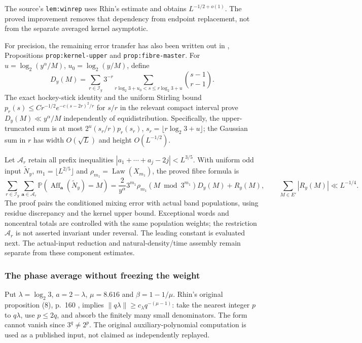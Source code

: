 The source's \texttt{lem:winrep} uses Rhin's estimate and obtains
$L^{-1/2+o(1)}$. The proved improvement removes that dependency from
endpoint replacement, not from the separate averaged kernel asymptotic.

For precision, the remaining error transfer has also been written out in
,
Propositions \texttt{prop:kernel-upper} and \texttt{prop:fibre-master}.
For $u=\log_2(y^\alpha/M)$, $u_0=\log_2(y/M)$, define
\[
 D_y(M)=\sum_{r\in\mathcal I_y}3^{-r}
       \sum_{r\log_2 3+u_0<s\le r\log_2 3+u}\binom{s-1}{r-1}.
\]
The exact hockey-stick identity and the uniform Stirling bound
$p_r(s)\le Cr^{-1/2}e^{-c(s-2r)^2/r}$ for $s/r$ in the relevant compact
interval prove $D_y(M)\ll y^\alpha/M$ independently of equidistribution.
Specifically, the upper-truncated sum is at most
$2^u(s_r/r)p_r(s_r)$, $s_r=\lfloor r\log_2 3+u\rfloor$;
the Gaussian sum in $r$ has width $O(\sqrt L)$ and height $O(L^{-1/2})$.

Let $\mathcal A_r$ retain all prefix inequalities
$|a_1+\cdots+a_j-2j|<L^{3/5}$. With uniform odd input $\widetilde N_y$,
$m_1=\lfloor L^{2/5}\rfloor$ and $\rho_{m_1}=\operatorname{Law}(X_{m_1})$,
the proved fibre formula is
\[
 \sum_{r\in\mathcal I_y}\sum_{\mathbf a\in\mathcal A_r}
 \mathbb P(\operatorname{Aff}_{\mathbf a}(\widetilde N_y)=M)
 =\frac{2}{y^\alpha}3^{m_1}\rho_{m_1}(M\bmod3^{m_1})D_y(M)+R_y(M),
 \qquad\sum_{M\in E'}|R_y(M)|\ll L^{-1/4}.
\]
The proof pairs the conditioned mixing error with actual band populations,
using residue discrepancy and the kernel upper bound. Exceptional words
and noncentral totals are controlled with the same population weights;
the restriction $\mathcal A_r$ is not asserted invariant under reversal.
The leading constant is evaluated next. The actual-input reduction and
natural-density/time assembly remain separate from these component estimates.

\subsubsection{The phase average without freezing the weight}
\label{subsec:Allikvere-phase-average}

Put $\lambda=\log_2 3$, $a=2-\lambda$, $\mu=8.616$ and
$\beta=1-1/\mu$. Rhin's original proposition (8), p.~160
\cite{Rhin1987}, implies $\|q\lambda\|\ge c_\lambda q^{-(\mu-1)}$:
take the nearest integer $p$ to $q\lambda$, use $p\le2q$, and absorb
the finitely many small denominators. The form cannot vanish since
$3^q\ne2^p$. The original auxiliary-polynomial computation is used
as a published input, not claimed as independently replayed.

